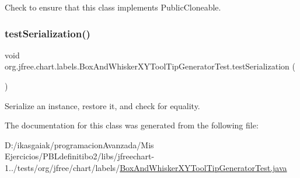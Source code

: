 Check to ensure that this class implements Public\+Cloneable. \mbox{\label{classorg_1_1jfree_1_1chart_1_1labels_1_1_box_and_whisker_x_y_tool_tip_generator_test_ac9b7a90d21b3f06c46265a7c8dcbcfa7}} 
\subsubsection{\texorpdfstring{test\+Serialization()}{testSerialization()}}
{\footnotesize\ttfamily void org.\+jfree.\+chart.\+labels.\+Box\+And\+Whisker\+X\+Y\+Tool\+Tip\+Generator\+Test.\+test\+Serialization (\begin{DoxyParamCaption}{ }\end{DoxyParamCaption})}

Serialize an instance, restore it, and check for equality. 

The documentation for this class was generated from the following file\+:\begin{DoxyCompactItemize}
\item 
D\+:/ikasgaiak/programacion\+Avanzada/\+Mis Ejercicios/\+P\+B\+Ldefinitibo2/libs/jfreechart-\/1../tests/org/jfree/chart/labels/\mbox{\hyperlink{_box_and_whisker_x_y_tool_tip_generator_test_8java}{Box\+And\+Whisker\+X\+Y\+Tool\+Tip\+Generator\+Test.\+java}}\end{DoxyCompactItemize}
